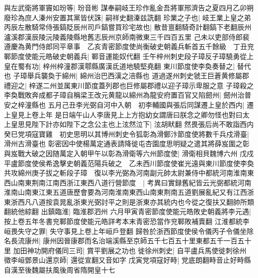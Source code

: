 與左武衛將軍竇如玢等|{
	玢音彬}
謀奉嗣岐王珍作亂金吾將軍邢濟告之夏四月乙卯朔廢珍為庶人溱州安置其黨皆伏誅|{
	嗣祥史翻溱兹詵翻}
珍業之子也|{
	岐王業上皇之弟}
丙辰左散騎常侍張鎬貶辰州司戶鎬嘗買珍宅故也|{
	散昔亶翻騎奇計翻鎬下老翻辰州瀘溪郡漢辰陵沅陵義陵縣地舊志辰州京師南微東三千四百五里}
己未以吏部侍郎裴遵慶為黄門侍郎同平章事　乙亥青密節度使尚衡破史朝義兵斬首五千餘級　丁丑兖鄆節度使能元皓破史朝義兵|{
	鄆音運能奴代翻}
壬午梓州刺史段子璋反子璋驍勇從上皇在蜀有功|{
	梓州梓潼郡漢鄠縣廣漢氐道地驍堅堯翻}
東川節度使李奐奏替之|{
	替代也}
子璋舉兵襲奐于綿州|{
	綿州治巴西漢之涪縣也}
道過遂州刺史虢王巨蒼黄修屬郡禮迎之|{
	梓遂二州並属東川節度蓋列郡也巨修屬郡禮以迎子璋示卑服之意}
子璋殺之李奐戰敗奔成都子璋自稱梁王改元黄龍以綿州為龍安府置百官又陷劒州|{
	劒州治普安之梓潼縣也}
五月己丑李光弼自河中入朝　初李輔國與張后同謀遷上皇於西内|{
	遷上皇見上卷上年}
是日端午山人李唐見上上方抱幼女謂唐曰朕念之卿勿怪也對曰太上皇思見陛下計亦如陛下之念公主也上泫然泣下|{
	泫胡畎翻}
然畏張后尚不敢詣西内　癸巳党項寇寶雞　初史思明以其博州刺史令狐彰為滑鄭汴節度使將數千兵戍滑臺|{
	滑州古滑臺也}
彰密因中使楊萬定通表請降徙屯杏園度思明疑之遣其將薛岌圍之彰與岌戰大破之因随萬定入朝甲午以彰為滑衛等六州節度使|{
	滑衛相貝魏博六州}
戊戍平盧節度使侯希逸擊史朝義范陽兵破之　乙未西川節度使崔光遠與東川節度使李奐共攻綿州庚子拔之斬段子璋　復以李光弼為河南副元帥太尉兼侍中都統河南淮南東西山南東荆南江南西浙江東西八道行營節度　|{
	考異曰實録舊紀皆云光弼都統河南淮南山南東江東五道唐歷會要為河南淮南東西山南東荆南五道劉展亂紀又有江西浙東浙西凡八道按袁晁亂浙東光弼討平之則是浙東亦其統内也今從之復扶又翻帥所類翻統他綜翻}
出鎮臨淮|{
	臨淮郡泗州}
六月甲寅青密節度使能元皓敗史朝義將李元遇|{
	按上卷五年冬書兖鄆節度使能元皓詳考本末青密恐當作兖鄆敗補賣翻}
江淮都統李峘畏失守之罪|{
	失守事見上卷上年峘戶登翻}
歸咎於浙西節度使侯令儀丙子令儀坐除名長流康州|{
	康州因晉康郡而名治端溪縣至京師五千七百五十里東都五千一百五十里}
加田神功開府儀同三司|{
	賞平劉展之功也}
徙徐州刺史|{
	自平盧兵馬使徙刺徐州}
徵李峘鄧景山還京師|{
	還從宣翻又音如字}
戊寅党項寇好畤|{
	党底朗翻畤音止好畤縣自漢至後魏屬扶風後周省隋開皇十七}


